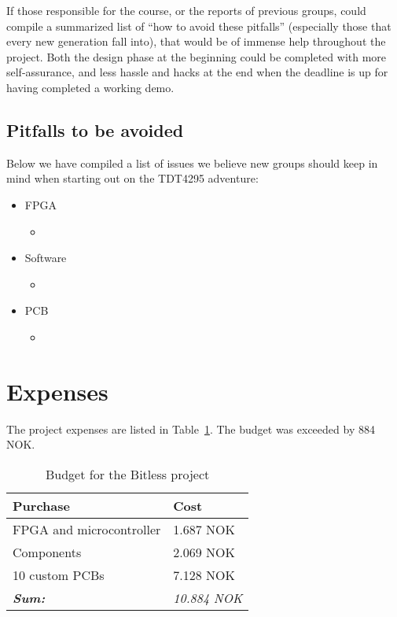 If those responsible for the course, or the reports of previous groups, could
compile a summarized list of ``how to avoid these pitfalls'' (especially those
that every new generation fall into), that would be of immense help throughout
the project. Both the design phase at the beginning could be completed with more
self-assurance, and less hassle and hacks at the end when the deadline is up for
having completed a working demo.

\subsection{Pitfalls to be avoided}\label{conclusion:pitfalls}

Below we have compiled a list of issues we believe new groups should keep in
mind when starting out on the TDT4295 adventure:

\begin{itemize}
	\item FPGA
	\begin{itemize}
		\item
	\end{itemize}
	\item Software
	\begin{itemize}
		\item
	\end{itemize}
	\item PCB
	\begin{itemize}
		\item
	\end{itemize}
\end{itemize}

\clearpage
\section{Expenses}
The project expenses are listed in Table~\ref{tab:budget}. The budget was exceeded by 884 NOK.

\begin{table}[H]
	\centering
	\begin{tabular}{|l|l|}
		\hline
		\textbf{Purchase} & \textbf{Cost} \\
		\hline
		\hline
		FPGA and microcontroller & 1.687 NOK\\
		\hline
		Components & 2.069 NOK\\
		\hline
		10 custom PCBs & 7.128 NOK \\
		\hline
		\hline
		\textbf{\textit{Sum:}} & \textit{10.884 NOK}\\
		\hline
	\end{tabular}
	\caption{Budget for the Bitless project}
	\label{tab:budget}
\end{table}
